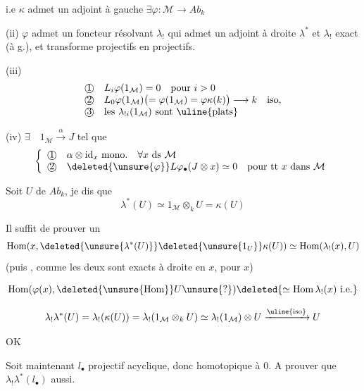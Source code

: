  i.e $\kappa$ admet un adjoint à gauche
$\exists\varphi:\mathcal M\longrightarrow Ab_k$

(ii) $\varphi$ admet un foncteur résolvant $\lambda_!$
 qui admet un adjoint à droite $\lambda^*$
et $\lambda_!$ exact (à g.), et transforme projectifs en projectifs.

(iii) 
\[
\begin{array}{ll}
\text{\textcircled{1}}&L_i\varphi(1_{\mathcal M})=0\quad\text{pour }i>0\\
\text{\textcircled{2}}&L_0\varphi(1_{\mathcal M})\bigl(=\varphi(1_{\mathcal M})=\varphi\kappa(k)\bigr)\longrightarrow k\quad\text{iso},\\
\text{\textcircled{3}}&\text{les }\lambda_{!i}(1_{\mathcal M})\text{ sont \uline{plats}}
\end{array}
\]

(iv) $\exists\quad1_{\mathcal M}\xrightarrow\alpha J$ tel que
\[
\left\{\begin{array}{ll}
\text{\textcircled{1}}&\alpha\otimes\mathrm{id}_x\text{ mono.}\quad\forall x\text{ ds }\mathcal M\\
\text{\textcircled{2}}&\deleted{\unsure{\varphi}}L\varphi_\bullet(J\otimes x)\simeq0\quad\text{pour tt }x\text{ dans }\mathcal M
\end{array}\right.
\]

\deleted{\unsure{$\lambda$}} Soit $U$ de $Ab_k$, je dis que
\[
\lambda^*(U)\simeq1_{\mathcal M}\otimes_kU=\kappa(U)
\]

Il suffit de prouver un 
\[
\operatorname{Hom}(x,\deleted{\unsure{\lambda^*(U)}}\deleted{\unsure{1_U}}\kappa(U))
\simeq\operatorname{Hom}(\lambda_!(x),U)
\]
 (puis , comme les deux sont exacts à droite en $x$,  pour  $x$)

\[
\operatorname{Hom}(\varphi(x),\deleted{\unsure{\mathrm{Hom}}}U\unsure{?})
\deleted{\simeq\operatorname{Hom}\lambda_!(x)\text{ i.e.}}
\]

\[
\lambda_!\lambda^*(U)=\lambda_!(\kappa(U))=\lambda_!(1_{\mathcal M}\otimes_kU)
\simeq\lambda_!(1_{\mathcal M})\otimes U\xrightarrow{\uline{\text{iso}}}U
\]

OK

Soit maintenant $l_\bullet$ projectif  acyclique,
donc homotopique à $0$. A prouver que $\lambda_!\lambda^*(l_\bullet)$ aussi.

